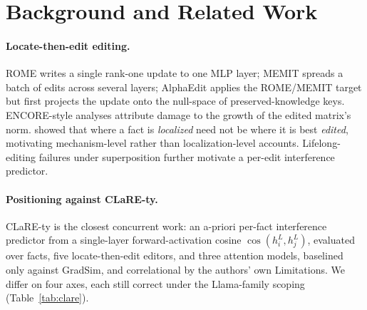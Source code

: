 \section{Background and Related Work}
\label{sec:related}

\paragraph{Locate-then-edit editing.} ROME \citep{meng2022rome} writes a
single rank-one update to one MLP layer; MEMIT \citep{meng2023memit} spreads a
batch of edits across several layers; AlphaEdit \citep{fang2025alphaedit}
applies the ROME/MEMIT target but first projects the update onto the
null-space of preserved-knowledge keys. ENCORE-style analyses
\citep{gupta2024encore} attribute damage to the growth of the edited matrix's
norm. \citet{hase2023doeslocalization} showed that where a fact is
\emph{localized} need not be where it is best \emph{edited}, motivating
mechanism-level rather than localization-level accounts. Lifelong-editing
failures under superposition \citep{superposition2024} further motivate a
per-edit interference predictor.

\paragraph{Positioning against CLaRE-ty.} CLaRE-ty
\citep{clarety2026} is the closest concurrent work: an a-priori per-fact
interference predictor from a single-layer forward-activation cosine
$\cos(h_i^L,h_j^L)$, evaluated over \clareNfacts{} facts, five locate-then-edit
editors, and three attention models, baselined only against GradSim, and
correlational by the authors' own Limitations. We differ on four axes, each
still correct under the Llama-family scoping (Table~\ref{tab:clare}).

